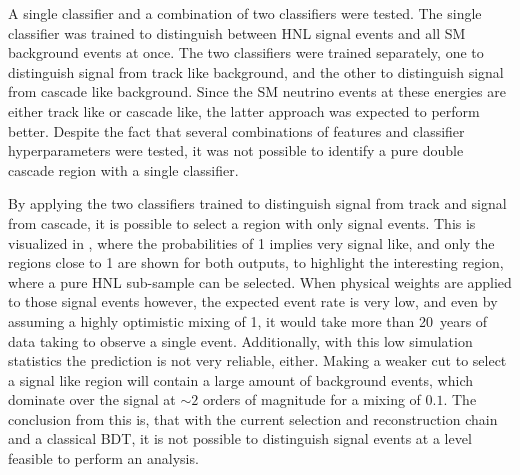 A single classifier and a combination of two classifiers were tested. The single classifier was trained to distinguish between HNL signal events and all SM background events at once. The two classifiers were trained separately, one to distinguish signal from track like background, and the other to distinguish signal from cascade like background. Since the SM neutrino events at these energies are either track like or cascade like, the latter approach was expected to perform better. Despite the fact that several combinations of features and classifier hyperparameters were tested, it was not possible to identify a pure double cascade region with a single classifier.



By applying the two classifiers trained to distinguish signal from track and signal from cascade, it is possible to select a region with only signal events. This is visualized in , where the probabilities of 1 implies very signal like, and only the regions close to 1 are shown for both outputs, to highlight the interesting region, where a pure HNL sub-sample can be selected. When physical weights are applied to those signal events however, the expected event rate is very low, and even by assuming a highly optimistic mixing of 1, it would take more than \SI{20}{years} of data taking to observe a single event. Additionally, with this low simulation statistics the prediction is not very reliable, either. Making a weaker cut to select a signal like region will contain a large amount of background events, which dominate over the signal at $\sim2$ orders of magnitude for a mixing of $0.1$. The conclusion from this is, that with the current selection and reconstruction chain and a classical BDT, it is not possible to distinguish signal events at a level feasible to perform an analysis.

